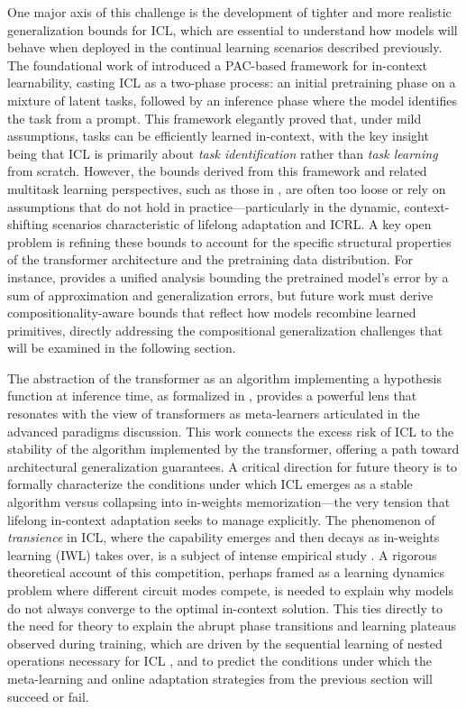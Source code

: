 \documentclass[11pt]{article}
\begin{document}
One major axis of this challenge is the development of tighter and more realistic generalization bounds for ICL, which are essential to understand how models will behave when deployed in the continual learning scenarios described previously. The foundational work of \cite{ref603} introduced a PAC-based framework for in-context learnability, casting ICL as a two-phase process: an initial pretraining phase on a mixture of latent tasks, followed by an inference phase where the model identifies the task from a prompt. This framework elegantly proved that, under mild assumptions, tasks can be efficiently learned in-context, with the key insight being that ICL is primarily about \emph{task identification} rather than \emph{task learning} from scratch. However, the bounds derived from this framework and related multitask learning perspectives, such as those in \cite{ref76}, are often too loose or rely on assumptions that do not hold in practice---particularly in the dynamic, context-shifting scenarios characteristic of lifelong adaptation and ICRL. A key open problem is refining these bounds to account for the specific structural properties of the transformer architecture and the pretraining data distribution. For instance, \cite{ref46} provides a unified analysis bounding the pretrained model's error by a sum of approximation and generalization errors, but future work must derive compositionality-aware bounds that reflect how models recombine learned primitives, directly addressing the compositional generalization challenges that will be examined in the following section.

The abstraction of the transformer as an algorithm implementing a hypothesis function at inference time, as formalized in \cite{ref2}, provides a powerful lens that resonates with the view of transformers as meta-learners articulated in the advanced paradigms discussion. This work connects the excess risk of ICL to the stability of the algorithm implemented by the transformer, offering a path toward architectural generalization guarantees. A critical direction for future theory is to formally characterize the conditions under which ICL emerges as a stable algorithm versus collapsing into in-weights memorization---the very tension that lifelong in-context adaptation seeks to manage explicitly. The phenomenon of \emph{transience} in ICL, where the capability emerges and then decays as in-weights learning (IWL) takes over, is a subject of intense empirical study \cite{ref55}. A rigorous theoretical account of this competition, perhaps framed as a learning dynamics problem where different circuit modes compete, is needed to explain why models do not always converge to the optimal in-context solution. This ties directly to the need for theory to explain the abrupt phase transitions and learning plateaus observed during training, which are driven by the sequential learning of nested operations necessary for ICL \cite{ref55}, and to predict the conditions under which the meta-learning and online adaptation strategies from the previous section will succeed or fail.
\end{document}

